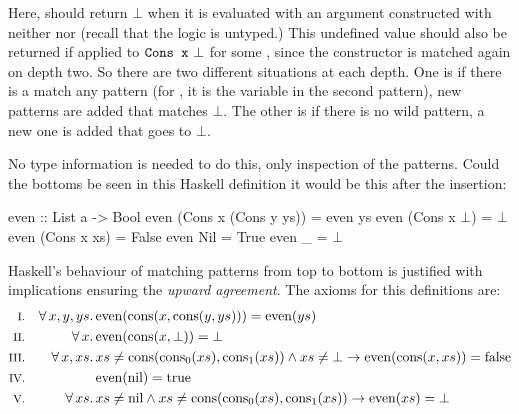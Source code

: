 Here,  should return $\bot$ when it is evaluated with an
argument constructed with neither  nor  (recall that
the logic is untyped.) This undefined value should also be returned if
applied to $\texttt{Cons x\,\,}\bot$ for some , since the 
constructor is matched again on depth two. So there are two different
situations at each depth. One is if there is a match any pattern (for
, it is the variable  in the second pattern), new
patterns are added that matches $\bot$. The other is if there is no
wild pattern, a new one is added that goes to $\bot$.

\begin{comment}
First, it needs to be determined if there is a match-anything branch or not.
For \hs{even} above, there is no match anything case, so a new one is added
that matches anything that is not

For each matched constructor, we need to add a new match to bottom,
which evaluates to bottom. Unnecessary bottoms can be carelessly added
since overlapping patterns are removed \emph{afterwards}. Furthermore,
a wild pattern is added at the end that goes to bottom in case there
are other constructors for the data type not mentioned in the
patterns.
\end{comment}

No type information is needed to do this, only inspection of the
patterns. Could the bottoms be seen in this Haskell definition it
would be this after the insertion:

\begin{code}[mathescape]
even :: List a -> Bool
even (Cons x (Cons y ys)) = even ys
even (Cons x $\bot$)            = $\bot$
even (Cons x xs)          = False
even Nil                  = True
even _                    = $\bot$
\end{code}

Haskell's behaviour of matching patterns from top to bottom is
justified with implications ensuring the \emph{upward agreement}. The
axioms for this definitions are:
\newcommand\uncons[1]{\cons{\fn{cons_0}(#1)}{\fn{cons_1}(#1)}}
\newcommand\even[1]{\fn{even}(#1)}
\newcommand\cons[2]{\fn{cons}(#1,#2)}
\begin{align*}
\rom{1} && \faaa{x}{y}{ys} & \even{\cons{x}{\cons{y}{ys}}} = \even{ys} \\
\rom{2} && \fa{x}          & \even{\cons{x}{\bot}}         = \bot      \\
\rom{3} && \faa{x}{xs}     & xs \neq \uncons{xs} \wedge xs \neq \bot \rightarrow \even{\cons{x}{xs}} = \fn{false}  \\
\rom{4} &&                 & \even{\fn{nil}} = \fn{true} \\
\rom{5} && \fa{xs}         & xs \neq \fn{nil} \wedge
                             xs \neq \uncons{xs}
                             \rightarrow \even{xs} = \bot
\end{align*}


